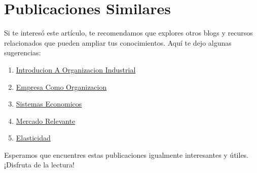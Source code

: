 \documentclass[
  man,
  floatsintext,
  longtable,
  a4paper,
  nolmodern,
  notxfonts,
  notimes,
  12pt,
  colorlinks=true,linkcolor=blue,citecolor=blue,urlcolor=blue]{apa7}
\providecommand{\tightlist}{%
  \setlength{\itemsep}{0pt}\setlength{\parskip}{0pt}}
\begin{document}
\section{Publicaciones Similares}\label{publicaciones-similares}

Si te interesó este artículo, te recomendamos que explores otros blogs y
recursos relacionados que pueden ampliar tus conocimientos. Aquí te dejo
algunas sugerencias:

\begin{enumerate}
\def\labelenumi{\arabic{enumi}.}
\tightlist
\item
  \href{https://optimums.netlify.app/organizacion-industrial/2023-06-12-introducion-a-organizacion-industrial/index.pdf}{}
  \href{https://optimums.netlify.app/organizacion-industrial/2023-06-12-introducion-a-organizacion-industrial}{Introducion
  A Organizacion Industrial}
\item
  \href{https://optimums.netlify.app/organizacion-industrial/2023-06-13-empresa-como-organizacion/index.pdf}{}
  \href{https://optimums.netlify.app/organizacion-industrial/2023-06-13-empresa-como-organizacion}{Empresa
  Como Organizacion}
\item
  \href{https://optimums.netlify.app/organizacion-industrial/2023-06-13-sistemas-economicos/index.pdf}{}
  \href{https://optimums.netlify.app/organizacion-industrial/2023-06-13-sistemas-economicos}{Sistemas
  Economicos}
\item
  \href{https://optimums.netlify.app/organizacion-industrial/2023-06-15-mercado-relevante/index.pdf}{}
  \href{https://optimums.netlify.app/organizacion-industrial/2023-06-15-mercado-relevante}{Mercado
  Relevante}
\item
  \href{https://optimums.netlify.app/organizacion-industrial/2023-06-23-elasticidad/index.pdf}{}
  \href{https://optimums.netlify.app/organizacion-industrial/2023-06-23-elasticidad}{Elasticidad}
\end{enumerate}

Esperamos que encuentres estas publicaciones igualmente interesantes y
útiles. ¡Disfruta de la lectura!
\end{document}
